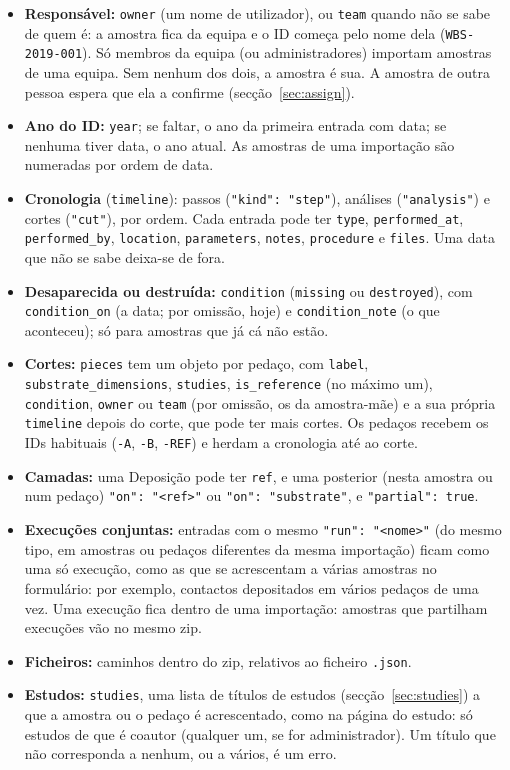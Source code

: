 \documentclass[11pt,a4paper]{article}
\newcommand{\sid}[1]{\texttt{#1}}
\begin{document}
\begin{itemize}
  \item \textbf{Responsável:} \texttt{owner} (um nome de utilizador), ou
        \texttt{team} quando não se sabe de quem é: a amostra fica da equipa e
        o ID começa pelo nome dela (\sid{WBS-2019-001}). Só membros da equipa
        (ou administradores) importam amostras de uma equipa. Sem nenhum dos
        dois, a amostra é sua. A amostra de outra pessoa espera que ela a
        confirme (secção~\ref{sec:assign}).
  \item \textbf{Ano do ID:} \texttt{year}; se faltar, o ano da primeira
        entrada com data; se nenhuma tiver data, o ano atual. As amostras de
        uma importação são numeradas por ordem de data.
  \item \textbf{Cronologia} (\texttt{timeline}): passos
        (\texttt{"kind": "step"}), análises (\texttt{"analysis"}) e cortes
        (\texttt{"cut"}), por ordem. Cada entrada pode ter \texttt{type},
        \texttt{performed\_at}, \texttt{performed\_by}, \texttt{location},
        \texttt{parameters}, \texttt{notes}, \texttt{procedure} e
        \texttt{files}. Uma data que não se sabe deixa-se de fora.
  \item \textbf{Desaparecida ou destruída:} \texttt{condition}
        (\texttt{missing} ou \texttt{destroyed}), com \texttt{condition\_on}
        (a data; por omissão, hoje) e \texttt{condition\_note} (o que
        aconteceu); só para amostras que já cá não estão.
  \item \textbf{Cortes:} \texttt{pieces} tem um objeto por pedaço, com
        \texttt{label}, \texttt{substrate\_dimensions}, \texttt{studies}, \texttt{is\_reference}
        (no máximo um), \texttt{condition}, \texttt{owner} ou \texttt{team} (por omissão, os da
        amostra-mãe) e a sua própria \texttt{timeline} depois do corte, que pode
        ter mais cortes. Os pedaços recebem os IDs habituais (\sid{-A},
        \sid{-B}, \sid{-REF}) e herdam a cronologia até ao corte.
  \item \textbf{Camadas:} uma Deposição pode ter \texttt{ref}, e uma posterior
        (nesta amostra ou num pedaço) \texttt{"on": "<ref>"} ou
        \texttt{"on": "substrate"}, e \texttt{"partial": true}.
  \item \textbf{Execuções conjuntas:} entradas com o mesmo \texttt{"run": "<nome>"}
        (do mesmo tipo, em amostras ou pedaços diferentes da mesma importação) ficam
        como uma só execução, como as que se acrescentam a várias amostras no
        formulário: por exemplo, contactos depositados em vários pedaços de uma vez.
        Uma execução fica dentro de uma importação: amostras que partilham
        execuções vão no mesmo zip.
  \item \textbf{Ficheiros:} caminhos dentro do zip, relativos ao ficheiro
        \texttt{.json}.
  \item \textbf{Estudos:} \texttt{studies}, uma lista de títulos de estudos
        (secção~\ref{sec:studies}) a que a amostra ou o pedaço é acrescentado,
        como na página do estudo: só estudos de que é coautor (qualquer um, se
        for administrador). Um título que não corresponda a nenhum, ou a vários,
        é um erro.
\end{itemize}
\end{document}
